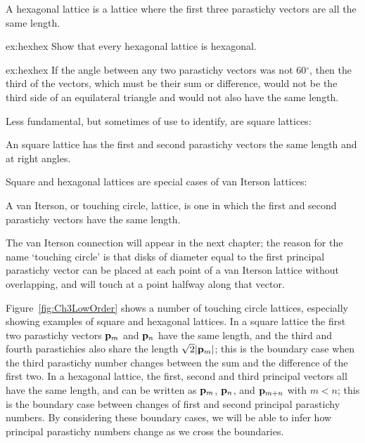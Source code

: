 \begin{definition}
	A hexagonal lattice is a lattice where the first three parastichy vectors are all the same length. 
\end{definition}
\begin{jExercise}{ex:hexhex}
	Show that every hexagonal lattice is hexagonal.
\end{jExercise}
\begin{jAnswer}{ex:hexhex}
	If the angle between any two parastichy vectors was not 60$^\circ$, then the third of the vectors, which must be their sum or difference, would not be the third side of an equilateral triangle and would not also have the same length.
\end{jAnswer}
Less fundamental, but sometimes of use to identify, are square lattices:
\begin{definition}
	An square lattice has the first and second parastichy vectors the same length and at right angles. 
\end{definition}
Square and hexagonal lattices are special cases of van Iterson lattices:
\begin{definition}
	A van Iterson, or touching circle, lattice, is one in which the first and second parastichy vectors have the same length.
\end{definition}
\clearpage
The van Iterson connection will appear in the next chapter; the reason for the name `touching circle' is that disks of diameter equal to the first principal parastichy vector can be placed at each point of a van Iterson lattice without overlapping, and will touch at a point halfway along that vector. 


Figure~\ref{fig:Ch3LowOrder} shows a number of touching circle lattices, especially showing examples of square and hexagonal lattices. 
%
In a square lattice the first two parastichy vectors ${\mathbf p}_{m}$ and ${\mathbf p}_{n}$ have the same length, and the third and fourth parastichies also share the length $\sqrt{2}|{\mathbf p}_{m}|$; this is the boundary case when the third parastichy number changes between the sum and the difference of the first two. In a hexagonal lattice, the  first,  second and third principal  vectors all have the same length, and can be written as ${\mathbf p}_{m}$, ${\mathbf p}_{n}$, and ${\mathbf p}_{m+n}$ with $m<n$; this is the boundary case between changes of first and second principal parastichy numbers. 
By considering these boundary cases, we will be able to  infer how principal parastichy numbers change as we cross the boundaries.  



